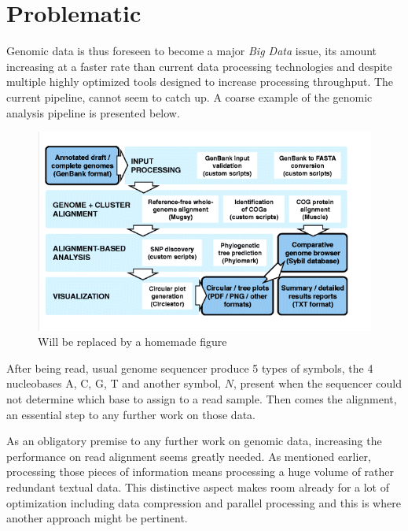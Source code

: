 \section{Problematic}

Genomic data is thus foreseen to become a major \textit{Big Data} issue, its amount increasing at a faster rate than current data processing technologies and despite multiple highly optimized tools designed to increase processing throughput. The current pipeline, cannot seem to catch up. A coarse example of the genomic analysis pipeline is presented below. \\

\begin{minipage}[t]{0.60\textwidth}
\begin{figure}[H]
    \centering
    \includegraphics[scale = 0.4]{Figures/pipeline.png}
    \caption{Will be replaced by a homemade figure}
    \label{fig:analysispipe}
\end{figure}
\end{minipage}
\begin{minipage}[t]{0.350\textwidth}
After being read, usual genome sequencer produce 5 types of symbols, the 4 nucleobases A, C, G, T and another symbol, $N$, present when the sequencer could not determine which base to assign to a read sample. Then comes the alignment, an essential step to any further work on those data. \\

\end{minipage}
\vspace*{5mm}



As an obligatory premise to any further work on genomic data, increasing the performance on read alignment seems greatly needed. As mentioned earlier, processing those pieces of information means processing a huge volume of rather redundant textual data. This distinctive aspect makes room already for a lot of optimization including data compression and parallel processing and this is where another approach might be pertinent. \\

